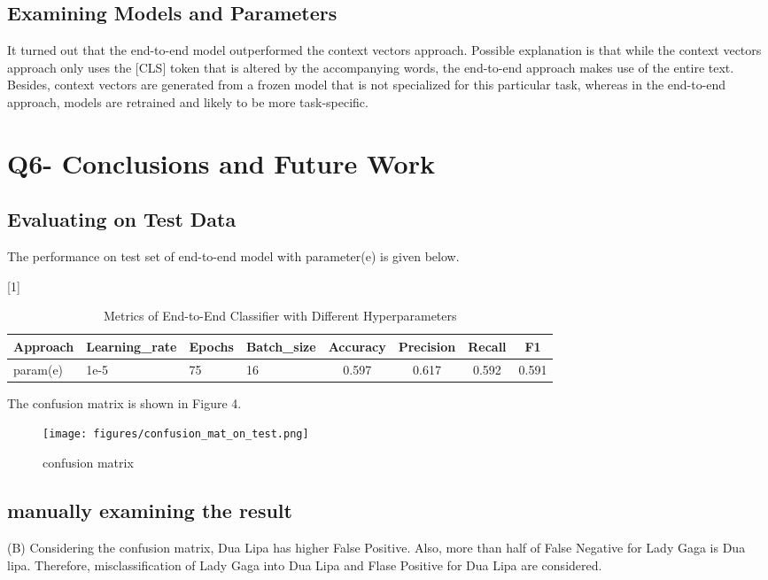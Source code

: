 \documentclass[a4paper,11pt]{article}
\begin{document}
\subsection{Examining Models and Parameters}
It turned out that the end-to-end model outperformed the context vectors approach.
Possible explanation is  that while the context vectors approach only uses the [CLS] token that is altered by the accompanying words,
the end-to-end approach makes use of the entire text.
Besides, context vectors are generated from a frozen model that is not specialized for this particular task,
whereas in the end-to-end approach, models are retrained and likely to be more task-specific.


\section{Q6- Conclusions and Future Work}
\subsection{Evaluating on Test Data}
The performance on test set of end-to-end model with parameter(e) is given below.
\begin{table}[htbp]
    \centering
    \caption{Metrics of End-to-End Classifier with Different Hyperparameters}
    \small
    \scalebox{1}[1]{
    \begin{tabular}{l|lll|cccc}
         Approach & Learning\_rate & Epochs & Batch\_size & Accuracy & Precision & Recall & F1 \\ \hline 
         param(e)                  & 1e-5& 75& 16  & 0.597 & 0.617 & 0.592  & 0.591 \\
    \end{tabular}
    }
\end{table}

The confusion matrix is shown in Figure 4.
\begin{figure}[htbp]
  \begin{center}
  \texttt{[image: figures/confusion\_mat\_on\_test.png]}
  \caption{confusion matrix}
  \end{center}
\end{figure}

\subsection{manually examining the result}
(B)
Considering the confusion matrix, Dua Lipa has higher False Positive.
Also, more than half of False Negative for Lady Gaga is Dua lipa.
Therefore, misclassification of Lady Gaga into Dua Lipa and Flase Positive for Dua Lipa are considered.
\end{document}

